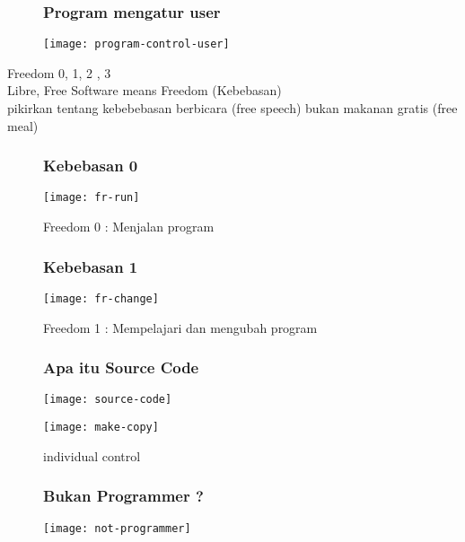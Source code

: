 \documentclass[notes]{beamer}       %
\begin{document}
\begin{frame}
  \begin{figure}
    \frametitle{Program mengatur user}
    \centering
    \texttt{[image: program-control-user]}
  \end{figure}
\end{frame}

\begin{frame}
  \begin{center}
    \Huge Freedom 0, 1, 2 , 3 \\
    \Large Libre, Free Software means Freedom (Kebebasan) \\
    \normalsize pikirkan tentang kebebebasan berbicara (free speech) bukan makanan gratis (free meal)
  \end{center}
\end{frame}

\begin{frame}
  \begin{figure}
    \frametitle{Kebebasan 0}
    \centering
    \texttt{[image: fr-run]}
    \caption{Freedom 0 : Menjalan program}
  \end{figure}
\end{frame}

\begin{frame}
  \begin{figure}
    \frametitle{Kebebasan 1}
    \centering
    \texttt{[image: fr-change]}
    \caption{Freedom 1 : Mempelajari dan mengubah program}
  \end{figure}
\end{frame}

\begin{frame}
  \begin{figure}
    \frametitle{Apa itu Source Code}
    \centering
    \texttt{[image: source-code]}
  \end{figure}
\end{frame}

\begin{frame}
  \begin{figure}
    \centering
    \texttt{[image: make-copy]}
    \caption{individual control}
  \end{figure}
\end{frame}

\begin{frame}
  \begin{figure}
    \frametitle{Bukan Programmer ?}
    \centering
    \texttt{[image: not-programmer]}
  \end{figure}
\end{frame}
\end{document}
